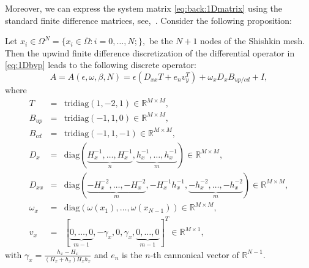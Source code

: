 Moreover, we can express the system matrix \eqref{eq:back:1Dmatrix} using the standard finite difference matrices, see,~\cite[Section~2]{PalSim15}. Consider the following proposition:
%
\begin{prop}
Let $x_i\in\Omega^N=\{x_i\in\overline{\Omega}:i=0,\ldots,N;\},$
be the $N+1$ nodes of the Shishkin mesh. Then the upwind finite
difference discretization of the differential operator in \eqref{eq:1Dbvp}
leads to the following discrete operator:
\begin{equation}\label{eq:1Dkronrep}
A =
A(\epsilon,\omega,\beta, N) =
\epsilon (D_{xx}T+e_{n}v_{y}^T) + \omega_xD_xB_{up/cd} + I,
\end{equation}
where
\begin{eqnarray}
T      &=& \mathrm{tridiag}(1,-2,1) \in \mathbb{R}^{M\times M},\nonumber\\
B_{up} &=& \mathrm{tridiag}(-1,1,0) \in \mathbb{R}^{M\times M},\nonumber\\
B_{cd} &=& \mathrm{tridiag}(-1,1,-1)\in \mathbb{R}^{M\times M},\nonumber\\
D_{x}  &=& \mathrm{diag}\left(\underbrace{H_x^{-1},\dots,
           H_x^{-1}}_{n},\underbrace{h_x^{-1},\ldots,
           h_x^{-1}}_{m}\right)\in\mathbb{R}^{M\times M},\\
D_{xx} &=& \mathrm{diag}\left(\underbrace{-H_x^{-2}, \ldots, -H_x^{-2}}_{m},
           -H_x^{-1}h_x^{-1}, \underbrace{-h_x^{-2},\ldots, -h_x^{-2}}_{m}
           \right)\in\mathbb{R}^{M\times M},\nonumber \\
\omega_x &=& \mathrm{diag}(\omega(x_1),\ldots,
             \omega(x_{N-1}))\in\mathbb{R}^{M\times M},\nonumber \\
v_x  &=& [\underbrace{0,\ldots,0}_{m-1},-\gamma_x,0,\gamma_x,\underbrace{0,\ldots,0}_{m-1}]^T\in\mathbb{R}^{M\times 1},\nonumber
\end{eqnarray}
with $\gamma_x=\frac{h_x-H_x}{(H_x+h_x)H_xh_x}$ and $e_n$ is the $n$-th
cannonical vector of $\mathbb{R}^{N-1}$.
\end{prop}

